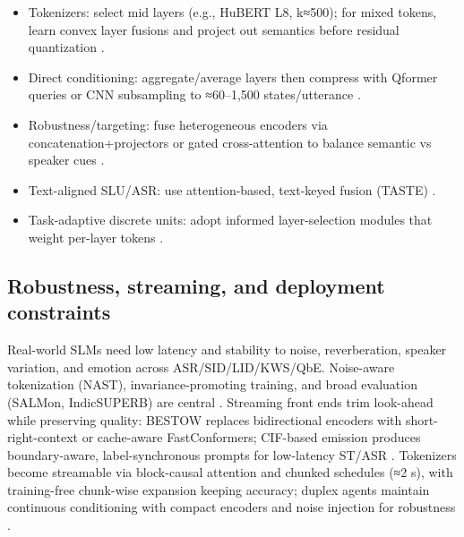 \begin{itemize}
  \item Tokenizers: select mid layers (e.g., HuBERT L8, k≈500); for mixed tokens, learn convex layer fusions and project out semantics before residual quantization \cite{hussein2025hasrdhierarchicalacousticsemanticreprese,chen2023reducingbarriersselfsupervisedlearninghu}.
  \item Direct conditioning: aggregate/average layers then compress with Qformer queries or CNN subsampling to ≈60–1{,}500 states/utterance \cite{lu2024destaenhancingspeechlanguagemodelsthroug}.
  \item Robustness/targeting: fuse heterogeneous encoders via concatenation+projectors or gated cross-attention to balance semantic vs speaker cues \cite{mei2025shnumultilingualconversationalspeechreco,lin2025dkusystemmultispeakerautomaticspeechreco}.
  \item Text-aligned SLU/ASR: use attention-based, text-keyed fusion (TASTE) \cite{tseng2025tastetextalignedspeechtokenizationembedd}.
  \item Task-adaptive discrete units: adopt informed layer-selection modules that weight per-layer tokens \cite{mousavi2024howshouldweextractdiscreteaudiotokenssel}.
\end{itemize}

\subsection{Robustness, streaming, and deployment constraints} \label{subsec:Robustness, streaming, and deployment constraints}
Real-world SLMs need low latency and stability to noise, reverberation, speaker variation, and emotion across ASR/SID/LID/KWS/QbE. Noise-aware tokenization (NAST), invariance-promoting training, and broad evaluation (SALMon, IndicSUPERB) are central \cite{messica2024nastnoiseawarespeechtokenizationlanguage,maimon2025salmonsuiteacousticlanguagemodelevaluati,entry2025indicsuperbspeechprocessinguniversalperf}. Streaming front ends trim look-ahead while preserving quality: BESTOW replaces bidirectional encoders with short-right-context or cache-aware FastConformers; CIF-based emission produces boundary-aware, label-synchronous prompts for low-latency ST/ASR \cite{chen2024bestowefficientstreamablespeechlanguagem,deng2025simuls2sllmunlockingsimultaneousinferenc}. Tokenizers become streamable via block-causal attention and chunked schedules (≈2 s), with training-free chunk-wise expansion keeping accuracy; duplex agents maintain continuous conditioning with compact encoders and noise injection for robustness \cite{zeng2024scalingspeechtextpretrainingsyntheticint,chang2024dcspinspeakerinvariantspeechtokenizerspo,ma2024languagemodelcanlistenwhilespeaking}.

